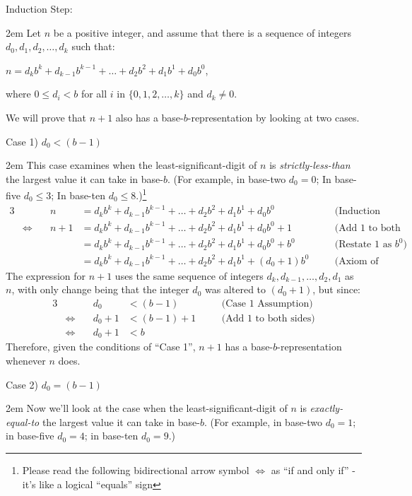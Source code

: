 \documentclass{article}
\newenvironment{jprIn}{\begin{adjustwidth}{2em}{}}{\end{adjustwidth}}
\begin{document}
\bigskip
Induction Step:
\begin{jprIn}
Let $n$ be a positive integer, and assume that
there is a sequence
of integers $d_0, d_1, d_2,\dots{},d_k$ such that:

\hspace{3em}$n=d_kb^k+d_{k-1}b^{k-1}+\dots+d_2b^2+d_1b^1+d_0b^0$,

where $0\le{}d_i<b$ for all $i$ in $\{0,1,2,\dots{},k\}$ and $d_k\ne0$.

We will prove that $n+1$ also has a
base-$b$-representation by looking at two cases.

Case 1) $d_0<(b-1)$
\begin{jprIn}
This case examines when the least-significant-digit
of $n$ is \emph{strictly-less-than} the largest value it can take in base-$b$.
(For example, in base-two $d_0 = 0$;
In base-five $d_0\le{}3$;
In base-ten $d_0\le{}8$.)\footnote{Please read the following
bidirectional arrow symbol $\Leftrightarrow$
as ``if and only if'' - it's like a logical ``equals'' sign}
{\small
\begin{alignat*}{3}
  &&n
  &= d_kb^k+d_{k-1}b^{k-1}+\dots+d_2b^2+d_1b^1+d_0b^0 &&\quad\text{(Induction Assumption)}\\
  &\Leftrightarrow\quad
  &n+1
  &= d_kb^k+d_{k-1}b^{k-1}+\dots+d_2b^2+d_1b^1+d_0b^0 + 1 &&\quad\text{(Add 1 to both sides)}\\  
  &&&= d_kb^k+d_{k-1}b^{k-1}+\dots+d_2b^2+d_1b^1+d_0b^0 + b^0 &&\quad\text{(Restate 1 as }b^0\text{)}\\
  &&&= d_kb^k+d_{k-1}b^{k-1}+\dots+d_2b^2+d_1b^1 + (d_0+1)b^0 &&\quad\text{(Axiom of Distribution)}
\end{alignat*}
}The expression for $n+1$ uses the same sequence of
integers $d_k, d_{k-1},\dots{},d_2,d_1$ as $n$, with only
change being that the integer $d_0$ was altered to $(d_0{+}1)$, but since:
\begin{alignat*}{3}
  &&d_0
  &< (b-1) &&\quad\text{(Case 1 Assumption)}\\
  &\Leftrightarrow\quad
  &d_0+1
  &< (b-1)+1 &&\quad\text{(Add 1 to both sides)}\\  
  &\Leftrightarrow\quad
  &d_0+1
  &< b
\end{alignat*}
Therefore, given the conditions of ``Case 1'', $n+1$ has a base-$b$-representation whenever $n$ does.
\end{jprIn}

\bigskip
Case 2) $d_0=(b-1)$
\begin{jprIn}
Now we'll look at the case when the least-significant-digit of $n$ is \emph{exactly-equal-to}
the largest value it can take in base-$b$.
(For example, in base-two
$d_0=1$; in base-five
$d_0=4$; in base-ten $d_0=9$.)


\end{jprIn}
\end{jprIn}
\end{document}
